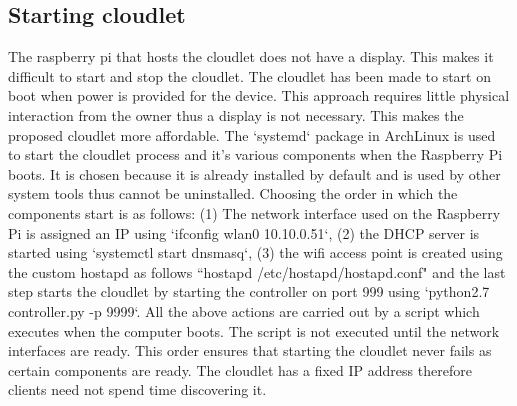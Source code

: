 \subsection{Starting cloudlet}
The raspberry pi that hosts the cloudlet does not have a display. This makes it difficult to start and stop the cloudlet. The cloudlet has been made to start on boot when power is provided for the device. This approach requires little physical interaction from the owner thus a display is not necessary. This makes the proposed cloudlet more affordable. The `systemd` package in ArchLinux is used to start the cloudlet process and it's various components when the Raspberry Pi boots. It is chosen because it is already installed by default and is used by other system tools thus cannot be uninstalled. Choosing the order in which the components start is as follows: (1) The network interface used on the Raspberry Pi is assigned an IP using `ifconfig wlan0 10.10.0.51`,  (2) the DHCP server is started using `systemctl start dnsmasq`, (3) the wifi access point is created using the custom hostapd as follows ``hostapd /etc/hostapd/hostapd.conf" and the last step starts the cloudlet by starting the controller on port 999 using `python2.7 controller.py -p 9999`. All the above actions are carried out by a script which executes when the computer boots. The script is not executed until the network interfaces are ready. This order ensures that starting the cloudlet never fails as certain components are ready. The cloudlet has a fixed IP address therefore clients need not spend time discovering it.


